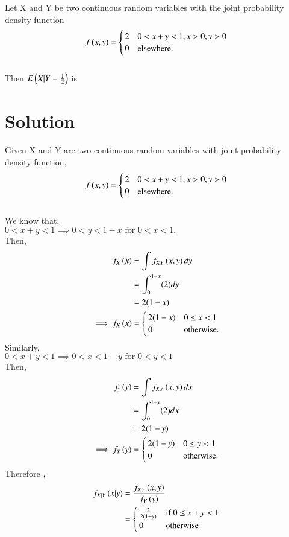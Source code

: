 Let X and Y be two continuous random variables with the joint probability density function 
\begin{align}
f\left(x,y\right)= 
\begin{cases}
2 & 0<x+y<1, x>0, y>0 \\
0 & \text{elsewhere}.
\end{cases}   
\end{align}
\\Then $E\left(X|Y=\frac{1}{2}\right)$ is 
\section{\textbf{Solution}}
Given X and Y are two continuous random variables with joint probability density function,
\begin{align}
f\left(x,y\right)= 
\begin{cases}
2 & 0<x+y<1, x>0, y>0 \\
0 & \text{elsewhere}.
\end{cases}    
\end{align}
\\We know that,\\
$0<x+y<1  \implies 0<y<1-x \text{ for } 0<x<1.$\\ 
Then,
\begin{align}
    f_X\left(x\right) &= \int f_{XY}\left(x,y\right)dy\\
    &= \int_{0}^{1-x} (2)dy\\
    &= 2(1-x)\\
\implies f_X\left(x\right) &=
    \begin{cases}
    2(1-x) & 0 \leq x <1\\
    0 & \text{otherwise}.
    \end{cases}
\end{align}
Similarly,\\
$ 0<x+y<1 \implies 0<x<1-y \text{ for } 0<y<1$ \\
Then,
\begin{align}
    f_y\left(y\right) &= \int f_{XY}\left(x,y\right)dx\\
    &= \int_{0}^{1-y} (2)dx\\
    &= 2(1-y)\\
\implies f_Y\left(y\right) &=
    \begin{cases}
    2(1-y) & 0 \leq y <1\\
    0 & \text{otherwise}.
    \end{cases}
\end{align}
Therefore ,
\begin{align}
    f_{X|Y}\left(x|y\right) &= \frac{f_{XY}\left(x,y\right)}{f_Y\left(y\right)}\\
    & = 
    \begin{cases}
    \frac{2}{2(1-y)} & \text{if } 0\leq x+y < 1\\
    0 & \text{otherwise}
    \end{cases}
\end{align}

